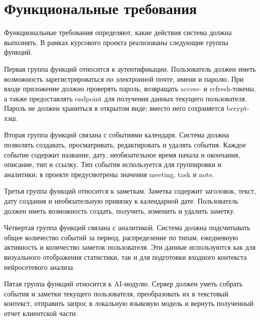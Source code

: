 \documentclass[14pt,a4paper]{extreport}
\begin{document}
\section{Функциональные требования}

Функциональные требования определяют, какие действия система должна выполнять. В рамках курсового проекта реализованы следующие группы функций.

Первая группа функций относится к аутентификации. Пользователь должен иметь возможность зарегистрироваться по электронной почте, имени и паролю. При входе приложение должно проверять пароль, возвращать access- и refresh-токены, а также предоставлять endpoint для получения данных текущего пользователя. Пароль не должен храниться в открытом виде; вместо него сохраняется bcrypt-хэш.

Вторая группа функций связана с событиями календаря. Система должна позволять создавать, просматривать, редактировать и удалять события. Каждое событие содержит название, дату, необязательное время начала и окончания, описание, тип и ссылку. Тип события используется для группировки и аналитики; в проекте предусмотрены значения meeting, task и note.

Третья группа функций относится к заметкам. Заметка содержит заголовок, текст, дату создания и необязательную привязку к календарной дате. Пользователь должен иметь возможность создать, получить, изменить и удалить заметку.

Четвертая группа функций связана с аналитикой. Система должна подсчитывать общее количество событий за период, распределение по типам, ежедневную активность и количество заметок пользователя. Эти данные используются как для визуального отображения статистики, так и для подготовки входного контекста нейросетевого анализа.

Пятая группа функций относится к AI-модулю. Сервер должен уметь собрать события и заметки текущего пользователя, преобразовать их в текстовый контекст, отправить запрос в локальную языковую модель и вернуть полученный отчет клиентской части.
\end{document}
